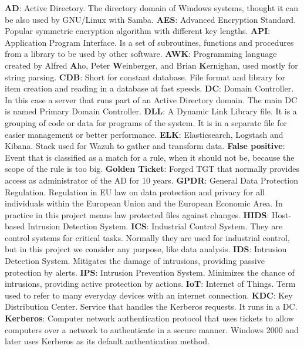 \textbf{AD}: Active Directory. The directory domain of Windows systems, thought it can be also used by GNU/Linux with Samba.
\linej
\linej
\textbf{AES}: Advanced Encryption Standard. Popular symmetric encryption algorithm with different key lengths.
\linej
\linej
\textbf{API}: Application Program Interface. Is a set of subroutines, functions and procedures from a library to be used by other software.
\linej
\linej
\textbf{AWK}: Programming language created by Alfred \textbf{A}ho, Peter \textbf{W}einberger, and Brian \textbf{K}ernighan, used mostly for string parsing.
\linej
\linej
\textbf{CDB}: Short for constant database. File format and library for item creation and reading in a database at fast speeds.
\linej
\linej
\textbf{DC}: Domain Controller. In this case a server that runs part of an Active Directory domain. The main DC is named Primary Domain Controller.
\linej
\linej
\textbf{DLL}: A Dynamic Link Library file. It is a grouping of code or data for programs of the system. It is in a separate file for easier management or better performance.
\linej
\linej
\textbf{ELK}: Elasticsearch, Logstash and Kibana. Stack used for Wazuh to gather and transform data.
\linej
\linej
\textbf{False positive}: Event that is classified as a match for a rule, when it should not be, because the scope of the rule is too big.
\linej
\linej
\textbf{Golden Ticket}: Forged TGT that normally provides access as administrator of the AD for 10 years.
\linej
\linej
\textbf{GPDR}: General Data Protection Regulation. Regulation in EU law on data protection and privacy for all individuals within the European Union and the European Economic Area. In practice in this project means law protected files against changes.
\linej
\linej
\textbf{HIDS}: Host-based Intrusion Detection System.
\linej
\linej
\textbf{ICS}: Industrial Control System. They are control systems for critical tasks. Normally they are used for industrial control, but in this project we consider any purpose, like data analysis.
\linej
\linej
\textbf{IDS}: Intrusion Detection System. Mitigates the damage of intrusions, providing passive protection by alerts.
\linej
\linej
\textbf{IPS}: Intrusion Prevention System. Minimizes the chance of intrusions, providing active protection by actions.
\linej
\linej
\textbf{IoT}: Internet of Things. Term used to refer to many everyday devices with an internet connection.
\linej
\linej
\textbf{KDC}: Key Distribution Center. Service that handles the Kerberos requests. It runs in a DC.
\linej
\linej
\textbf{Kerberos}: Computer network authentication protocol that uses tickets to allow computers over a network to authenticate in a secure manner. Windows 2000 and later uses Kerberos as its default authentication method.
